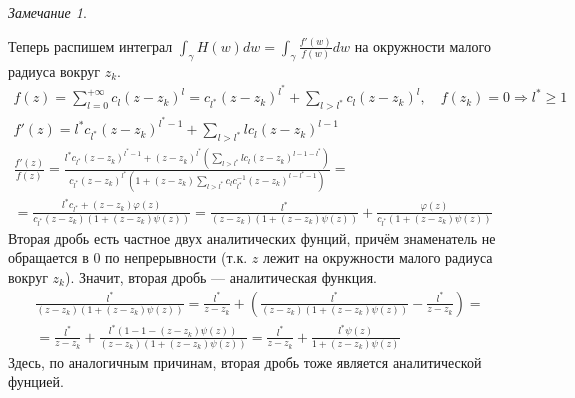 \documentclass[12pt]{article}
\newcommand{\Ra}{\Rightarrow}
\theoremstyle{thmnote}
\theoremstyle{remark}
\newtheorem*{remark}{Замечание}
\theoremstyle{defnote}
\begin{document}
\begin{remark}
\begin{center}
    \end{center}

    Теперь распишем интеграл $\int_\gamma H(w) dw = \int_\gamma \frac{f'(w)}{f(w)} dw$ на окружности малого радиуса вокруг $z_k$.
    \begin{gather*}
        f(z) = \sum_{l = 0}^{+\infty} c_l (z - z_k)^l = c_{l^*} (z - z_k)^{l^*} + \sum_{l > l^*} c_l (z - z_k)^l, \quad f(z_k) = 0 \Ra l^* \geq 1  \\
        f'(z) = l^* c_{l^*} (z - z_k)^{l^* - 1} + \sum_{l > l^*} l c_l (z - z_k)^{l - 1} \\
        \frac{f'(z)}{f(z)} = \frac{l^* c_{l^*} (z - z_k)^{l^* - 1} + (z - z_k)^{l^*} \left(\sum_{l > l^*} l c_l (z - z_k)^{l - 1 - l^*} \right)}{c_{l^*} (z - z_k)^{l^*} \left(1 + (z - z_k) \sum_{l > l^*} c_l c_{l^*}^{-1} (z - z_k)^{l - l^* - 1} \right)} = \\
        = \frac{l^* c_{l^*} + (z - z_k) \varphi(z)}{c_{l^*} (z - z_k) (1 + (z - z_k)\psi(z))} = \frac{l^*}{(z - z_k) (1 + (z - z_k)\psi(z))} + \frac{\varphi(z)}{c_{l^*} (1 + (z - z_k)\psi(z))}
    \end{gather*}
    Вторая дробь есть частное двух аналитических фунций, причём знаменатель не обращается в 0 по непрерывности (т.к. $z$  лежит на окружности малого радиуса вокруг $z_k$). Значит, вторая дробь --- аналитическая функция.
    \begin{gather*}
        \frac{l^*}{(z - z_k) (1 + (z - z_k) \psi(z))} = \frac{l^*}{z - z_k} + \left( \frac{l^*}{(z - z_k)(1 + (z - z_k) \psi(z))} - \frac{l^*}{z - z_k} \right) = \\
        = \frac{l^*}{z - z_k} + \frac{l^*(1 - 1 - (z - z_k) \psi(z))}{(z - z_k) (1 + (z - z_k)\psi(z))} = \frac{l^*}{z - z_k} + \frac{l^* \psi(z)}{1 + (z - z_k) \psi(z)}
    \end{gather*}
    Здесь, по аналогичным причинам, вторая дробь тоже является аналитической фунцией.


\end{remark}
\end{document}
